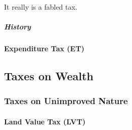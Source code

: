 It really is a fabled tax.

\subparagraph{History}

\paragraph{Expenditure Tax (ET)}  \label{sec:ET}


\subsection{Taxes on Wealth} %

\subsubsection{Taxes on Unimproved Nature}


\paragraph{Land Value Tax (LVT)}  \label{sec:LVT}



